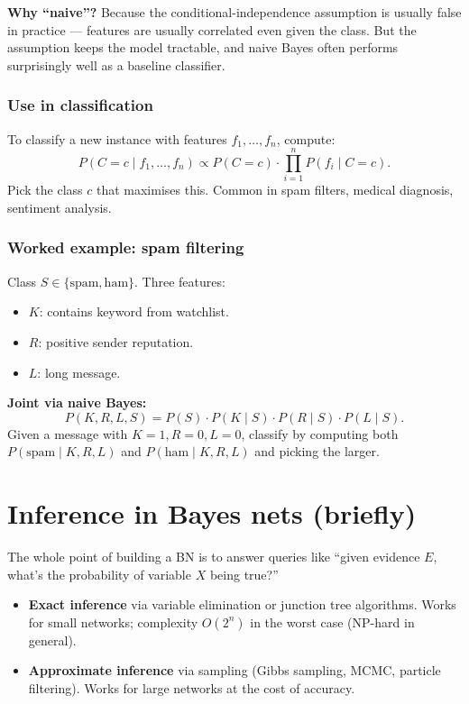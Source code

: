 \documentclass[11pt, a4paper]{article}
\begin{document}
\textbf{Why ``naive''?} Because the conditional-independence assumption is usually false in practice — features are usually correlated even given the class. But the assumption keeps the model tractable, and naive Bayes often performs surprisingly well as a baseline classifier.

\subsubsection*{Use in classification}

To classify a new instance with features $f_1, \dots, f_n$, compute:
\[
P(C = c \mid f_1, \dots, f_n) \propto P(C = c) \cdot \prod_{i=1}^n P(f_i \mid C = c).
\]
Pick the class $c$ that maximises this. Common in spam filters, medical diagnosis, sentiment analysis.

\subsubsection*{Worked example: spam filtering}

\begin{exbox}
Class $S \in \{\text{spam}, \text{ham}\}$. Three features:
\begin{itemize}[itemsep=0pt, topsep=0pt]
  \item $K$: contains keyword from watchlist.
  \item $R$: positive sender reputation.
  \item $L$: long message.
\end{itemize}
\textbf{Joint via naive Bayes:}
\[
P(K, R, L, S) = P(S) \cdot P(K \mid S) \cdot P(R \mid S) \cdot P(L \mid S).
\]
Given a message with $K = 1, R = 0, L = 0$, classify by computing both $P(\text{spam} \mid K, R, L)$ and $P(\text{ham} \mid K, R, L)$ and picking the larger.
\end{exbox}

\section{Inference in Bayes nets (briefly)}

The whole point of building a BN is to answer queries like ``given evidence $E$, what's the probability of variable $X$ being true?''

\begin{itemize}
  \item \textbf{Exact inference} via variable elimination or junction tree algorithms. Works for small networks; complexity $O(2^n)$ in the worst case (NP-hard in general).
  \item \textbf{Approximate inference} via sampling (Gibbs sampling, MCMC, particle filtering). Works for large networks at the cost of accuracy.
\end{itemize}
\end{document}
